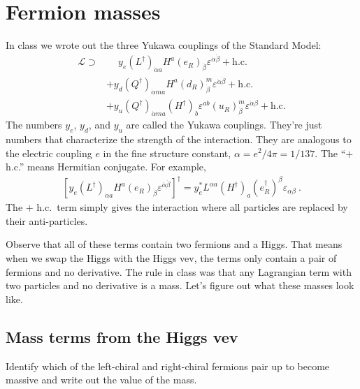 \documentclass[12pt]{article}
\numberwithin{equation}{section}    %
\begin{document}
\section{Fermion masses}

In class we wrote out the three Yukawa couplings of the Standard Model:
\begin{align}
	\mathcal L \supset  &
	\phantom{+}
	y_e \left(L^\dag\right)_{\dot{\alpha}a} H^a \left(e_R\right)_{\dot{\beta}}\varepsilon^{\dot{\alpha}\dot{\beta}}
	+ \text{h.c.}\\
	& +
	y_d \left(Q^\dag\right)_{\dot{\alpha}ma} H^a \left(d_R\right)_{\dot{\beta}}^m\varepsilon^{\dot{\alpha}\dot{\beta}}
	+ \text{h.c.}\\
	& +
	y_u \left(Q^\dag\right)_{\dot{\alpha}ma} \left(H^\dag\right)_b \varepsilon^{ab} \left(u_R\right)_{\dot{\beta}}^m\varepsilon^{\dot{\alpha}\dot{\beta}}
	+ \text{h.c.}
\end{align}
The numbers $y_e$, $y_d$, and $y_u$ are called the Yukawa couplings. They're just numbers that characterize the strength of the interaction. They are analogous to the electric coupling $e$ in the fine structure constant, $\alpha = e^2/4\pi = 1/137$. The ``$+$ h.c.'' means Hermitian conjugate. For example, 
\begin{align}
	\left[y_e \left(L^\dag\right)_{\dot{\alpha}a} H^a \left(e_R\right)_{\dot{\beta}}\varepsilon^{\dot{\alpha}\dot{\beta}}\right]^\dag
	=
	y_e^* L^{\alpha a} \left(H^\dag\right)_a \left(e_R^\dag\right)^{{\beta}}\varepsilon_{{\alpha}{\beta}} \ .
\end{align}
The $+$ h.c.\ term simply gives the interaction where all particles are replaced by their anti-particles. 

Observe that all of these terms contain two fermions and a Higgs. That means when we swap the Higgs with the Higgs vev, the terms only contain a pair of fermions and no derivative. The rule in class was that any Lagrangian term with two particles and no derivative is a mass. Let's figure out what these masses look like.

\subsection{Mass terms from the Higgs vev}

Identify which of the left-chiral and right-chiral fermions pair up to become massive and write out the value of the mass. 
\end{document}
